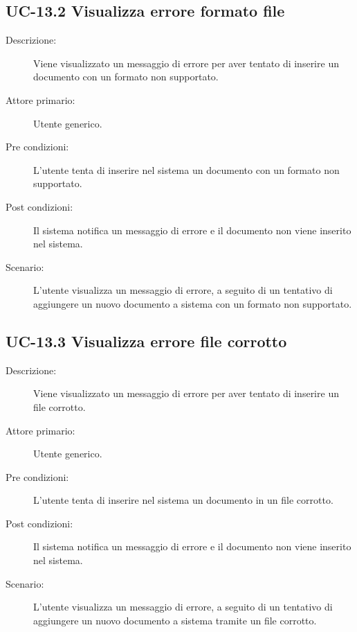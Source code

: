 \subsection{UC-13.2 Visualizza errore formato file}
\begin{description}
    \item[Descrizione:] Viene visualizzato un messaggio di errore per aver tentato di inserire un documento con un formato non supportato.
    \item[Attore primario:] Utente generico.
    \item[Pre condizioni:] L'utente tenta di inserire nel sistema un documento con un formato non supportato.
    \item[Post condizioni:] Il sistema notifica un messaggio di errore e il documento non viene inserito nel sistema.
    \item[Scenario:] L'utente visualizza un messaggio di errore, a seguito di un tentativo di aggiungere un nuovo documento a sistema con un formato non supportato.
\end{description}

\subsection{UC-13.3 Visualizza errore file corrotto}
\begin{description}
    \item[Descrizione:] Viene visualizzato un messaggio di errore per aver tentato di inserire un file corrotto.
    \item[Attore primario:] Utente generico.
    \item[Pre condizioni:] L'utente tenta di inserire nel sistema un documento in un file corrotto.
    \item[Post condizioni:] Il sistema notifica un messaggio di errore e il documento non viene inserito nel sistema.
    \item[Scenario:] L'utente visualizza un messaggio di errore, a seguito di un tentativo di aggiungere un nuovo documento a sistema tramite un file corrotto.
\end{description}

